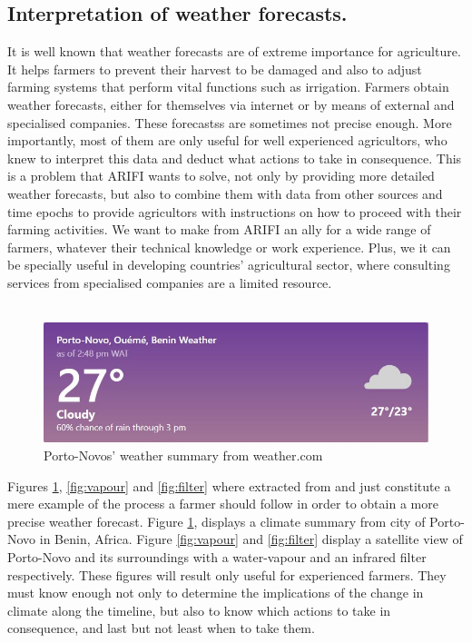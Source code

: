 \subsection{Interpretation of weather forecasts.}
%
It is well known that weather forecasts are of extreme importance for agriculture. It helps farmers to prevent their harvest to be damaged and also to adjust farming systems that perform vital functions such as irrigation. Farmers obtain weather forecasts, either for themselves via internet or by means of external and specialised companies. These forecastss are sometimes not precise enough. More importantly, most of them are only useful for well experienced agricultors, who knew to interpret this data and deduct what actions to take in consequence. This is a problem that ARIFI wants to solve, not only by providing more detailed weather forecasts, but also to combine them with data from other sources and time epochs to provide agricultors with instructions on how to proceed with their farming activities. We want to make from ARIFI an ally for a wide range of farmers, whatever their technical knowledge or work experience. Plus, we it can be specially useful in developing countries' agricultural sector, where consulting services from specialised companies are a limited resource.\\\\
%
%
\begin{figure}[b!]
    \centering
    \includegraphics[scale=0.7]{images/benin.JPG}
    \caption{Porto-Novos' weather summary from weather.com}
    \label{fig:benin}
\end{figure}
%
%
Figures \ref{fig:benin}, \ref{fig:vapour}  and \ref{fig:filter} where extracted from  and just constitute a mere example of the process a farmer should follow in order to obtain a more precise weather forecast. Figure \ref{fig:benin}, displays a climate summary from city of Porto-Novo in Benin, Africa. Figure \ref{fig:vapour} and \ref{fig:filter} display a satellite view of Porto-Novo and its surroundings with a water-vapour and an infrared filter respectively. These figures will result only useful for experienced farmers. They must know enough not only to determine the implications of the change in climate along the timeline, but also to know which actions to take in consequence, and last but not least when to take them.

